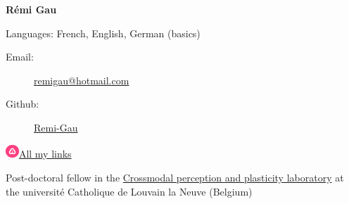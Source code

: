 \documentclass[a4paper,12pt,oneside]{letter}
\date{2021-04-10}
\begin{document}
\textbf{{\LARGE Rémi Gau}}

Languages: French, English, German (basics)

\doubleline

\begin{minipage}{.49\textwidth}
\begin{description}
    \item[Email:]
        \href{mailto:remi\textunderscore gau@hotmail.com}
            {remi\textunderscore gau@hotmail.com}
    \item[Github:]
        \href{https://github.com/Remi-Gau}{Remi-Gau}
 \end{description}
\end{minipage}
\begin{minipage}{.49\textwidth}
\begin{description}
    \item[\href{https://allmylinks.com/remi-gau}
                {\includegraphics[width=0.5cm]{./images/allmylinks.png}All my links}]
\end{description}
\end{minipage}
\vspace{10pt}

\doubleline


{



Post-doctoral fellow in the \href{https://cpplab.be/}{Crossmodal perception and plasticity laboratory}
at the université Catholique de Louvain la Neuve (Belgium)























% 

}
\end{document}
